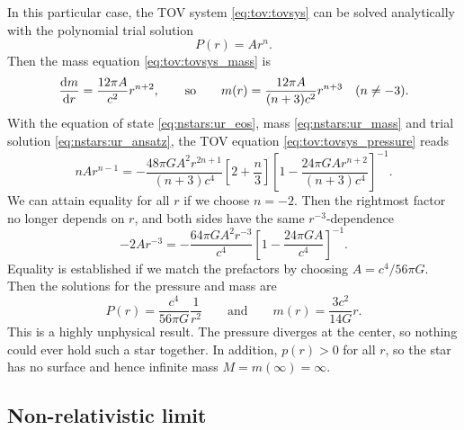 In this particular case, the TOV system \eqref{eq:tov:tovsys} can be solved analytically with the polynomial trial solution
\begin{equation}
	P(r) = A r^n .
\label{eq:nstars:ur_ansatz}
\end{equation}
Then the mass equation \eqref{eq:tov:tovsys_mass} is
\begin{equation}
	\odv{m}{r} = \frac{12 \pi A}{c^2} r^{n+2},
	\qquad \text{so} \qquad
	m(r) = \frac{12 \pi A}{(n+3) c^2} r^{n+3}
	\quad (n \neq -3).
\label{eq:nstars:ur_mass}
\end{equation}
With the equation of state \eqref{eq:nstars:ur_eos}, mass \eqref{eq:nstars:ur_mass} and trial solution \eqref{eq:nstars:ur_ansatz}, the TOV equation \eqref{eq:tov:tovsys_pressure} reads
\begin{equation}
	n A r^{n-1} =
	-\frac{48 \pi G A^2 r^{2n+1}}{(n+3) c^4} \left[ 2 + \frac{n}{3} \right] \left[ 1 - \frac{24 \pi G A r^{n+2}}{(n+3) c^4} \right]^{-1} .
\end{equation}
We can attain equality for all $r$ if we choose $n = -2$.
Then the rightmost factor no longer depends on $r$, and both sides have the same $r^{-3}$-dependence
\begin{equation}
	- 2 A r^{-3} = - \frac{64 \pi G A^2 r^{-3}}{c^4} \left[ 1 - \frac{24 \pi G A}{c^4} \right]^{-1} .
\end{equation}
Equality is established if we match the prefactors by choosing $A = c^4 / 56 \pi G$.
Then the solutions for the pressure and mass are
\begin{equation}
	P(r) = \frac{c^4}{56 \pi G} \frac{1}{r^2}
	\qquad \text{and} \qquad
	m(r) = \frac{3 c^2}{14 G} r .
\end{equation}
This is a highly unphysical result.
The pressure diverges at the center, so nothing could ever hold such a star together.
In addition, $p(r) > 0$ for all $r$, so the star has no surface and hence infinite mass $M = m(\infty) = \infty$.


\subsection{Non-relativistic limit}
\label{sec:nstars:nr_limit}

